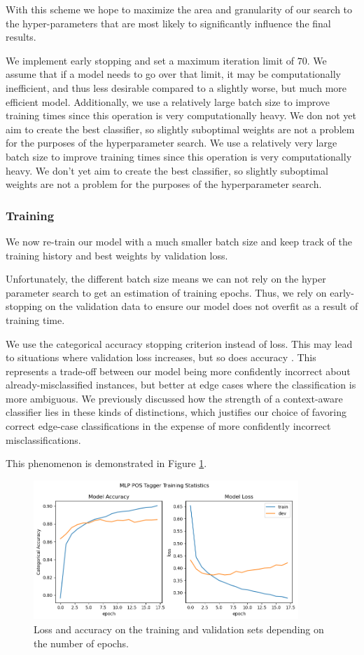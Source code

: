 \documentclass[10pt, a4paper]{article}
\begin{document}
	With this scheme we hope to maximize the area and granularity of our search to the hyper-parameters that are most likely to significantly influence the final results.
	
	We implement early stopping and set a maximum iteration limit of $70$. We assume that if a model needs to go over that limit, it may be computationally inefficient, and thus less desirable compared to a slightly worse, but much more efficient model. Additionally, we use a relatively large batch size to improve training times since this operation is very computationally heavy. We don not yet aim to create the best classifier, so slightly suboptimal weights are not a problem for the purposes of the hyperparameter search.
	We use a relatively very large batch size to improve training times since this operation is very computationally heavy. We don't yet aim to create the best classifier, so slightly suboptimal weights are not a problem for the purposes of the hyperparameter search.
	
	
	\subsubsection{Training}
		
	We now re-train our model with a much smaller batch size and keep track of the training history and best weights by validation loss. 
	
	Unfortunately, the different batch size means we can not rely on the hyper parameter search to get an estimation of training epochs. Thus, we rely on early-stopping on the validation data to ensure our model does not overfit as a result of training time. 
	
	We use the categorical accuracy stopping criterion instead of loss. This may lead to situations where validation loss increases, but so does accuracy \cite{loss-accuracy}. This represents a trade-off between our model being more confidently incorrect about already-misclassified instances, but better at edge cases where the classification is more ambiguous. We previously discussed how the strength of a context-aware classifier lies in these kinds of distinctions, which justifies our choice of favoring correct edge-case classifications in the expense of more confidently incorrect misclassifications.
	
	This phenomenon is demonstrated in Figure \ref{fig::ex_10_fit}.
	
	\begin{figure}
		\centering
		\includegraphics[width=10cm]{"ex_10_fit.png"}
		\caption{Loss and accuracy on the training and validation sets depending on the number of epochs.}
		\label{fig::ex_10_fit}
	\end{figure}
	
\end{document}
